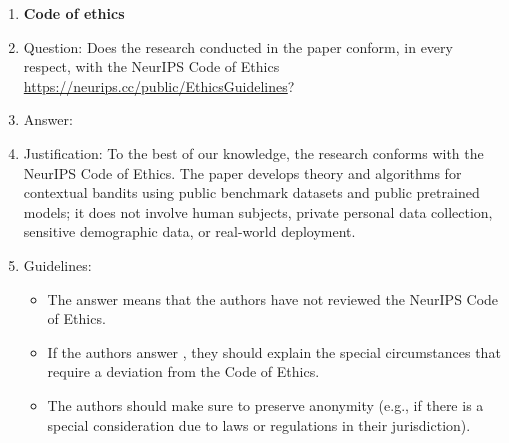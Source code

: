 \documentclass{article}
\theoremstyle{definition}
\theoremstyle{remark}
\theoremstyle{remark}
\begin{document}
\begin{enumerate}
\item {\bf Code of ethics}
    \item[] Question: Does the research conducted in the paper conform, in every respect, with the NeurIPS Code of Ethics \url{https://neurips.cc/public/EthicsGuidelines}?
    \item[] Answer: \answerYes{} %
    \item[] Justification: To the best of our knowledge, the research conforms with the NeurIPS Code of Ethics. The paper develops theory and algorithms for contextual bandits using public benchmark datasets and public pretrained models; it does not involve human subjects, private personal data collection, sensitive demographic data, or real-world deployment.
    \item[] Guidelines:
    \begin{itemize}
        \item The answer \answerNA{} means that the authors have not reviewed the NeurIPS Code of Ethics.
        \item If the authors answer \answerNo, they should explain the special circumstances that require a deviation from the Code of Ethics.
        \item The authors should make sure to preserve anonymity (e.g., if there is a special consideration due to laws or regulations in their jurisdiction).
    \end{itemize}



\end{enumerate}
\end{document}
